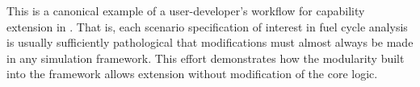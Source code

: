 This is a canonical example of a user-developer's workflow for capability 
extension in \Cyclus. That is, each scenario specification of interest in fuel
cycle analysis is usually sufficiently pathological that modifications must
almost always be made in any simulation framework. This effort demonstrates how 
the modularity built into
the \Cyclus framework allows extension without modification of the core logic.  


